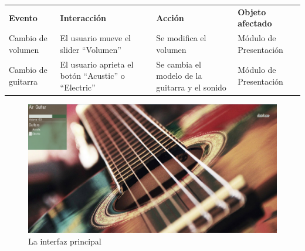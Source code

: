 \documentclass[a4paper,10pt]{article}
\begin{document}
\begin{tabularx}{\textwidth}{X X X X}
        \textbf{Evento} & \textbf{Interacción} & \textbf{Acción} & \textbf{Objeto afectado} \\
        Cambio de volumen & El usuario mueve el slider ``Volumen'' & Se
        modifica el volumen & Módulo de Presentación \\
        Cambio de guitarra & El usuario aprieta el botón ``Acustic'' o
        ``Electric'' & Se cambia el modelo de la guitarra y el sonido & Módulo
        de Presentación \\


\end{tabularx}
\begin{figure}[hb]
        \centering
        \includegraphics[width=\textwidth]{../imagenes/ui.png}
        \caption{La interfaz principal}
        \label{fig:ui}
\end{figure}
\newpage

\end{document}

